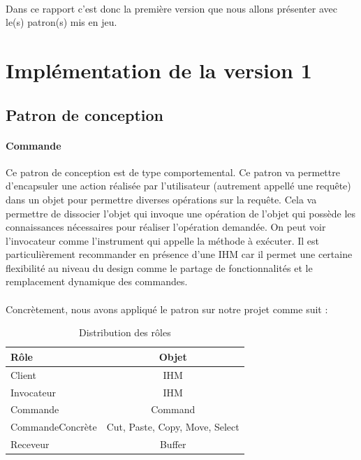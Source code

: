 \documentclass[a4paper,11pt]{article}
\begin{document}
\paragraph{}
Dans ce rapport c'est donc la première version que nous allons présenter avec le(s) patron(s) mis en jeu.



\section{Implémentation de la version 1}
\subsection{Patron de conception}

\paragraph{Commande} Ce patron de conception est de type comportemental. Ce patron va permettre d'encapsuler une action réalisée par l'utilisateur (autrement appellé une requête)  dans un objet pour permettre diverses opérations sur la requête. Cela va permettre de dissocier l'objet qui invoque une opération de l'objet qui possède les connaissances nécessaires pour réaliser l'opération demandée. On peut voir l'invocateur comme l'instrument qui appelle la méthode à exécuter. Il est particulièrement recommander en présence d'une IHM car il permet une certaine flexibilité au niveau du design comme le partage de fonctionnalités et le remplacement dynamique des commandes.
\paragraph{}
Concrètement, nous avons appliqué le patron sur notre projet comme suit : \\

\begin{table}[H]
\caption{Distribution des rôles}
\center
\begin{tabular}{||l|c||}
\hline
\textbf{Rôle} & \textbf{Objet}\\
\hline\hline
Client & IHM \\
\hline
Invocateur & IHM \\
\hline
Commande & Command \\
\hline
CommandeConcrète & Cut, Paste, Copy, Move,  Select \\
\hline
Receveur & Buffer \\
\hline
\end{tabular}
\end{table}
\end{document}
